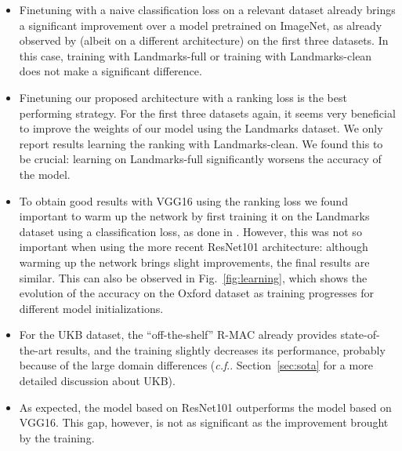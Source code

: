 \documentclass[twocolumn]{svjour3}          \smartqed  \usepackage{graphicx}
\makeatletter
\DeclareRobustCommand\onedot{\futurelet\@let@token\@onedot}
\def\@onedot{\ifx\@let@token.\else.\null\fi\xspace}
\def\cf{\emph{c.f}\onedot} \def\Cf{\emph{C.f}\onedot}
\makeatother
\begin{document}
\renewcommand\labelitemi{}
\begin{itemize}

\item Finetuning with a naive classification loss on a relevant dataset already brings a significant improvement over a model pretrained on ImageNet, as already observed by \cite{Babenko2014} (albeit on a different architecture) on the first three datasets.
In this case, training with Landmarks-full or training with Landmarks-clean does not make a significant difference. 

\item Finetuning our proposed architecture with a ranking loss is the best performing strategy. For the first three datasets again, it seems very beneficial to improve the weights of our model using the Landmarks dataset.
    We only report results learning the ranking with Landmarks-clean. We found this to be crucial: learning on Landmarks-full significantly worsens the accuracy of the model.
 
\item To obtain good results with VGG16 using the ranking loss we found important to warm up the network by first training it on the Landmarks dataset using a classification loss, as done in \cite{gordo2016deep}. However, this was not so important when using the more recent ResNet101 architecture: although warming up the network brings slight improvements, the final results are similar. This can also be observed in Fig.~\ref{fig:learning}, which shows the evolution of the accuracy on the Oxford dataset as training progresses for different model initializations.

\item  For the UKB dataset, the ``off-the-shelf'' R-MAC already provides state-of-the-art results, and the training slightly decreases its performance, probably because of the large domain differences (\cf Section~\ref{sec:sota} for a more detailed discussion about UKB).
 
\item As expected, the model based on ResNet101 outperforms the model based on VGG16. This gap, however, is not as significant as the improvement brought by the training. 


\end{itemize}
\end{document}
